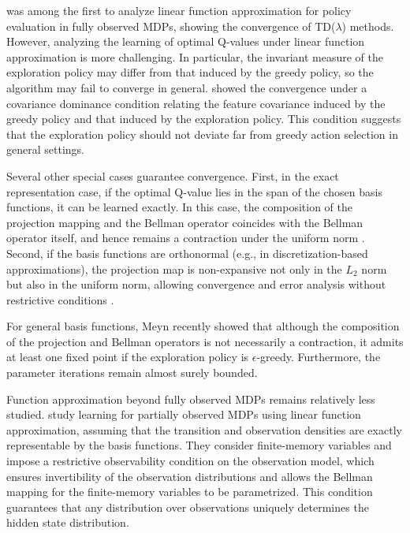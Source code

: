 \documentclass[11pt]{article}
\begin{document}
\cite{tsitsiklis1997analysis} was among the first to analyze linear function approximation for policy evaluation in fully observed MDPs, showing the convergence of TD($\lambda$) methods. However, analyzing the learning of optimal Q-values under linear function approximation is more challenging. In particular, the invariant measure of the exploration policy may differ from that induced by the greedy policy, so the algorithm may fail to converge in general. \cite{melo2008analysis} showed the convergence under a covariance dominance condition relating the feature covariance induced by the greedy policy and that induced by the exploration policy. This condition suggests that the exploration policy should not deviate far from greedy action selection in general settings.



Several other special cases guarantee convergence. First, in the exact representation case, if the optimal Q-value lies in the span of the chosen basis functions, it can be learned exactly. In this case, the composition of the projection mapping and the Bellman operator coincides with the Bellman operator itself, and hence remains a contraction under the uniform norm \cite{Ruszczy2024,jin2023provably}. Second, if the basis functions are orthonormal (e.g., in discretization-based approximations), the projection map is non-expansive not only in the $L_2$ norm but also in the uniform norm, allowing convergence and error analysis without restrictive conditions \cite{kara2023q}.

For general basis functions, Meyn \cite{meyn2024projected} recently showed that although the composition of the projection and Bellman operators is not necessarily a contraction, it admits at least one fixed point if the exploration policy is $\epsilon$-greedy. Furthermore, the parameter iterations remain almost surely bounded.

Function approximation beyond fully observed MDPs  remains relatively less studied.   \cite{cai2022reinforcement} study learning for partially observed MDPs using linear function approximation, assuming that the transition and observation densities are exactly representable by the basis functions. They consider finite-memory variables and impose a restrictive observability condition on the observation model, which ensures invertibility of the observation distributions and allows the Bellman mapping for the finite-memory variables to be parametrized. This condition guarantees that any distribution over observations uniquely determines the hidden state distribution.
\end{document}

